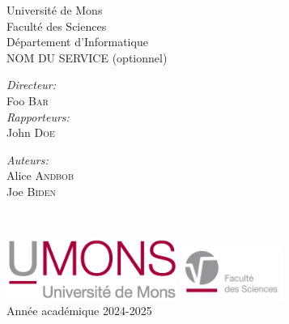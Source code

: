 \documentclass[12pt,a4paper, titlepage]{article}
\begin{document}
\begin{titlepage}
  \begin{center}
    \textnormal{\Large{Universit\'e de Mons}}\\[0.3em]
    \textnormal{\Large{Facult\'e des Sciences}}\\[0.3em]
    \textnormal{\Large{D\'epartement d'Informatique}}\\[0.3em]
    \textnormal{\Large{NOM DU SERVICE (optionnel)}}
  \end{center}
  \vspace*{3cm}
  \begin{center}
  \end{center}
  \vspace*{2cm}

  \begin{minipage}[t]{0.45\textwidth}
    \begin{flushleft} \large
      \emph{Directeur:}\\
      Foo \textsc{Bar}\\
      \emph{Rapporteurs:}\\
      John \textsc{Doe}\\
    \end{flushleft}
  \end{minipage}
  \begin{minipage}[t]{0.45\textwidth}
    \begin{flushright} \large
      \emph{Auteurs:} \\
      Alice \textsc{Andbob} \\
      Joe \textsc{Biden} \\
    \end{flushright}
  \end{minipage}\\[2ex]

  \vspace*{2cm}
  \begin{center}
    \includegraphics[height=2cm]{figures/UMONS-logo.jpg}
    \hspace{3cm}
    \includegraphics[height=1.7cm]{figures/FS-logo.jpg}
    \\[1em]
    Ann\'ee acad\'emique 2024{-}2025
  \end{center}

\end{titlepage}
\newpage
% 
\end{document}
